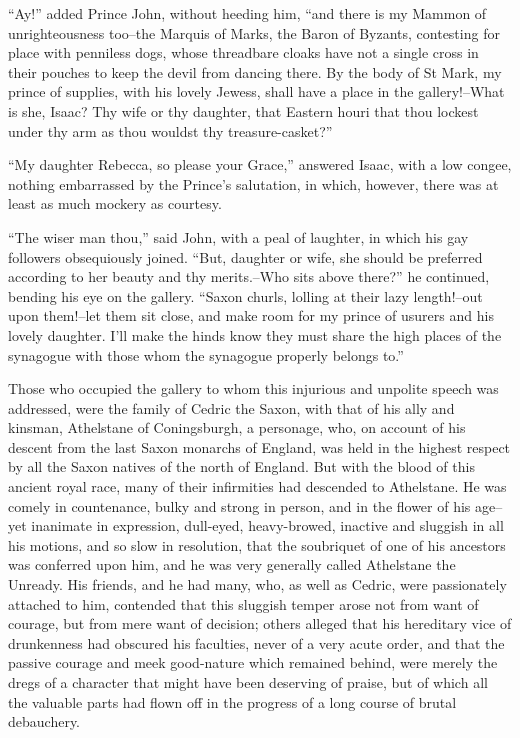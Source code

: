 ``Ay!'' added Prince John, without heeding him, ``and there is my Mammon
of unrighteousness too--the Marquis of Marks, the Baron of Byzants,
contesting for place with penniless dogs, whose threadbare cloaks have
not a single cross in their pouches to keep the devil from dancing
there. By the body of St Mark, my prince of supplies, with his lovely
Jewess, shall have a place in the gallery!--What is she, Isaac? Thy wife
or thy daughter, that Eastern houri that thou lockest under thy arm as
thou wouldst thy treasure-casket?''

``My daughter Rebecca, so please your Grace,'' answered Isaac, with a
low congee, nothing embarrassed by the Prince's salutation, in which,
however, there was at least as much mockery as courtesy.

``The wiser man thou,'' said John, with a peal of laughter, in which his
gay followers obsequiously joined. ``But, daughter or wife, she should
be preferred according to her beauty and thy merits.--Who sits above
there?'' he continued, bending his eye on the gallery. ``Saxon churls,
lolling at their lazy length!--out upon them!--let them sit close, and
make room for my prince of usurers and his lovely daughter. I'll make
the hinds know they must share the high places of the synagogue with
those whom the synagogue properly belongs to.''

Those who occupied the gallery to whom this injurious and unpolite
speech was addressed, were the family of Cedric the Saxon, with that of
his ally and kinsman, Athelstane of Coningsburgh, a personage, who, on
account of his descent from the last Saxon monarchs of England, was held
in the highest respect by all the Saxon natives of the north of England.
But with the blood of this ancient royal race, many of their infirmities
had descended to Athelstane. He was comely in countenance, bulky and
strong in person, and in the flower of his age--yet inanimate in
expression, dull-eyed, heavy-browed, inactive and sluggish in all his
motions, and so slow in resolution, that the soubriquet of one of his
ancestors was conferred upon him, and he was very generally called
Athelstane the Unready. His friends, and he had many, who, as well as
Cedric, were passionately attached to him, contended that this sluggish
temper arose not from want of courage, but from mere want of decision;
others alleged that his hereditary vice of drunkenness had obscured his
faculties, never of a very acute order, and that the passive courage and
meek good-nature which remained behind, were merely the dregs of a
character that might have been deserving of praise, but of which all the
valuable parts had flown off in the progress of a long course of brutal
debauchery.

